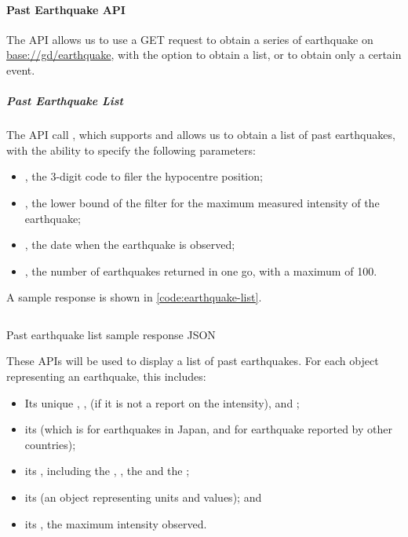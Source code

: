 
\paragraph{Past Earthquake API}

The API  allows us to use a GET request to obtain a series of earthquake on \url{base://gd/earthquake}, with the option to obtain a list, or to obtain only a certain event.

\subparagraph{Past Earthquake List} The API call , which supports  and  allows us to obtain a list of past earthquakes, with the ability to specify the following parameters:
\begin{itemize}
    \item {}, the 3-digit code to filer the hypocentre position;
    \item {}, the lower bound of the filter for the maximum measured intensity of the earthquake;
    \item {}, the date when the earthquake is observed;
    \item {}, the number of earthquakes returned in one go, with a maximum of 100.
\end{itemize}

A sample response is shown in \autoref{code:earthquake-list}.

\begin{listing}[htp]
    \inputminted{json}{code/GdEarthquakeList.json}
    \caption{Past earthquake list sample response JSON}
    \label{code:earthquake-list}
\end{listing}

These APIs will be used to display a list of past earthquakes. For each object representing an earthquake, this includes:
\begin{itemize}
    \item Its unique , ,  (if it is not a report on the intensity), and ;
    \item its  (which is  for earthquakes in Japan, and  for earthquake reported by other countries);
    \item its , including the , , the  and the ;
    \item its  (an object representing units and values); and
    \item its , the maximum intensity observed.
\end{itemize}


